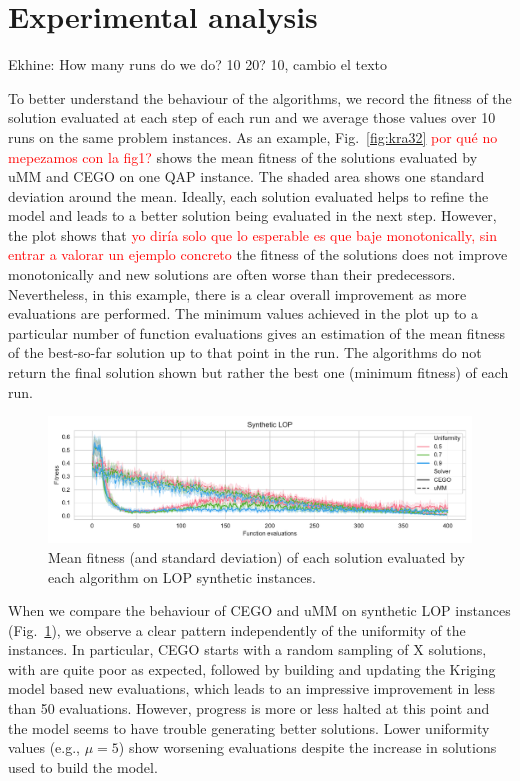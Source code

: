 \documentclass[runningheads]{llncs}
\begin{document}
\section{Experimental analysis}

Ekhine: How many runs do we do? 10 20? 10, cambio el texto

To better understand the behaviour of the algorithms, we record the fitness of
the solution evaluated at each step of each run and we average those values
over 10 runs on the same problem instances.  As an example, Fig.~\ref{fig:kra32} \textcolor{red}{por qué no mepezamos con la fig1?}
shows the mean fitness of the solutions evaluated by uMM and CEGO on one QAP
instance. The shaded area shows one standard deviation around the
mean. Ideally, each solution evaluated helps to refine the model and leads to a
better solution being evaluated in the next step.  However, the plot shows that \textcolor{red}{yo diría solo que lo esperable es que baje monotonically, sin entrar a valorar un ejemplo concreto}
the fitness of the solutions does not improve monotonically and new solutions
are often worse than their predecessors. Nevertheless, in this example, there
is a clear overall improvement as more evaluations are performed. The minimum
values achieved in the plot up to a particular number of function evaluations
gives an estimation of the mean fitness of the best-so-far solution up to that
point in the run. The algorithms do not return the final solution shown but
rather the best one (minimum fitness) of each run.


\begin{figure}
  \centering%
  \includegraphics[width=\textwidth]{img/synthetic_LOP_combined}
  \caption{Mean fitness  (and standard deviation)  of each solution evaluated by each algorithm on LOP synthetic instances.\label{fig:lop_synth}}
\end{figure}

When we compare the behaviour of CEGO and uMM on synthetic LOP instances
(Fig.~\ref{fig:lop_synth}), we observe a clear pattern independently of the
uniformity of the instances. In particular, CEGO starts with a random sampling
of X solutions, with are quite poor as expected, followed by building and
updating the Kriging model based new evaluations, which leads to an impressive
improvement in less than 50 evaluations. However, progress is more or less
halted at this point and the model seems to have trouble generating better
solutions. Lower uniformity values (e.g., $\mu=5$) show worsening evaluations
despite the increase in solutions used to build the model.
\end{document}
